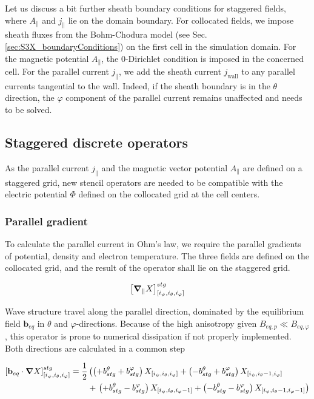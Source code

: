 Let us discuss a bit further sheath boundary conditions for staggered fields, where $A_\parallel$ and $j_\parallel$ lie on the domain boundary. For collocated fields, we impose sheath fluxes from the Bohm-Chodura model (see Sec. \ref{sec:S3X_boundaryConditions}) on the first cell in the simulation domain. For the magnetic potential $A_\parallel$, the 0-Dirichlet condition is imposed in the concerned cell. For the parallel current $j_\parallel$, we add the sheath current $j_{\text{wall}}$ to any parallel currents tangential to the wall. Indeed, if the sheath boundary is in the $\theta$ direction, the $\varphi$ component of the parallel current remains unaffected and needs to be solved. 



\subsection{Staggered discrete operators}
As the parallel current $j_\parallel$ and the magnetic vector potential $A_\parallel$ are defined on a staggered grid, new stencil operators are needed to be compatible with the electric potential $\Phi$ defined on the collocated grid at the cell centers. 



\subsubsection{Parallel gradient}

To calculate the parallel current in Ohm's law, we require the parallel gradients of potential, density and electron temperature. The three fields are defined on the collocated grid, and the result of the operator shall lie on the staggered grid. 

\begin{equation}
	\left[\grad_{\parallel}X\right]^{stg}_{[i_\psi,i_\theta, i_\varphi]}
\end{equation}

Wave structure travel along the parallel direction, dominated by the equilibrium field $\mathbf{b}_{eq}$ in $\theta$ and $\varphi$-directions. Because of the high anisotropy given $B_{eq,p} \ll B_{eq,\varphi}$, this operator is prone to numerical dissipation if not properly implemented. Both directions are calculated in a common step

\begin{align}
	\left[\textbf{b}_{eq}\cdot\grad X \right]^{stg}_{[i_\psi,i_\theta, i_\varphi]} = \frac{1}{2}&\left(
	\left(+b^\theta_{stg} + b^\varphi_{stg}\right)X_{[i_\psi,i_\theta, i_\varphi]} + 
	\left(-b^\theta_{stg} + b^\varphi_{stg}\right)X_{[i_\psi,i_\theta-1, i_\varphi]} \right. \nonumber\\  &+ \left. 
	\left(+b^\theta_{stg} - b^\varphi_{stg}\right)X_{[i_\psi,i_\theta, i_\varphi-1]} + 
	\left(-b^\theta_{stg} - b^\varphi_{stg}\right)X_{[i_\psi,i_\theta-1, i_\varphi-1]}\right)
	\label{eq:Impl_GradParaStencil_FS}
\end{align}

